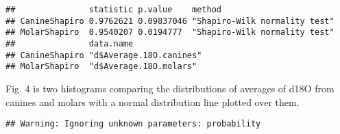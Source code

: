 \documentclass[]{article}
\newenvironment{Shaded}{\begin{snugshade}}{\end{snugshade}}
\newcommand{\KeywordTok}[1]{\textcolor[rgb]{0.13,0.29,0.53}{\textbf{#1}}}
\newcommand{\DataTypeTok}[1]{\textcolor[rgb]{0.13,0.29,0.53}{#1}}
\newcommand{\DecValTok}[1]{\textcolor[rgb]{0.00,0.00,0.81}{#1}}
\newcommand{\FloatTok}[1]{\textcolor[rgb]{0.00,0.00,0.81}{#1}}
\newcommand{\StringTok}[1]{\textcolor[rgb]{0.31,0.60,0.02}{#1}}
\newcommand{\OtherTok}[1]{\textcolor[rgb]{0.56,0.35,0.01}{#1}}
\newcommand{\OperatorTok}[1]{\textcolor[rgb]{0.81,0.36,0.00}{\textbf{#1}}}
\newcommand{\NormalTok}[1]{#1}
\begin{document}
\begin{verbatim}
##               statistic p.value    method                       
## CanineShapiro 0.9762621 0.09837046 "Shapiro-Wilk normality test"
## MolarShapiro  0.9540207 0.0194777  "Shapiro-Wilk normality test"
##               data.name              
## CanineShapiro "d$Average.18O.canines"
## MolarShapiro  "d$Average.18O.molars"
\end{verbatim}

Fig. 4 is two histograms comparing the distributions of averages of d18O
from canines and molars with a normal distribution line plotted over
them.

\begin{Shaded}
\end{Shaded}

\begin{verbatim}
## Warning: Ignoring unknown parameters: probability
\end{verbatim}
\end{document}
